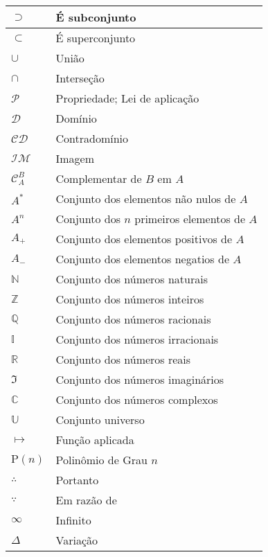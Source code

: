 \begin{center}
\begin{longtable}{| m{3cm} | m{12cm} |}
            \hline $ \supset $ & É subconjunto\\
            \hline $ \subset $ & É superconjunto\\
            \hline $ \cup $ & União\\
            \hline $ \cap $ & Interseção\\
            \hline $ \mathcal{P} $ & Propriedade; Lei de aplicação\\
            \hline $ \mathcal{D} $ & Domínio\\
            \hline $ \mathcal{CD} $ & Contradomínio\\
            \hline $ \mathcal{IM} $ & Imagem\\
            \hline $ \mathcal{C}^{B}_{A} $ & Complementar de $B$ em $A$\\
            \hline $ A^* $ & Conjunto dos elementos não nulos de $A$\\
            \hline $ A^n $ & Conjunto dos $n$ primeiros elementos de $A$\\
            \hline $ A_+ $ & Conjunto dos elementos positivos de $A$\\
            \hline $ A_- $ & Conjunto dos elementos negatios de $A$\\
            \hline $ \mathbb{N} $ & Conjunto dos números naturais\\
            \hline $ \mathbb{Z} $ & Conjunto dos números inteiros\\
            \hline $ \mathbb{Q} $ & Conjunto dos números racionais\\
            \hline $ \mathbb{I} $ & Conjunto dos números irracionais\\
            \hline $ \mathbb{R} $ & Conjunto dos números reais\\
            \hline $ \mathfrak{I} $ & Conjunto dos números imaginários\\
            \hline $ \mathbb{C} $ & Conjunto dos números complexos\\
            \hline $ \mathbb{U} $ & Conjunto universo\\
            \hline $ \mapsto $ & Função aplicada\\
            \hline $ \mathrm{P}(n) $ & Polinômio de Grau $n$\\
            \hline $ \therefore $ & Portanto\\
            \hline $ \because $ & Em razão de\\
            \hline $ \infty $ & Infinito\\
            \hline $ \Delta $ & Variação\\

\end{longtable}
\end{center}
